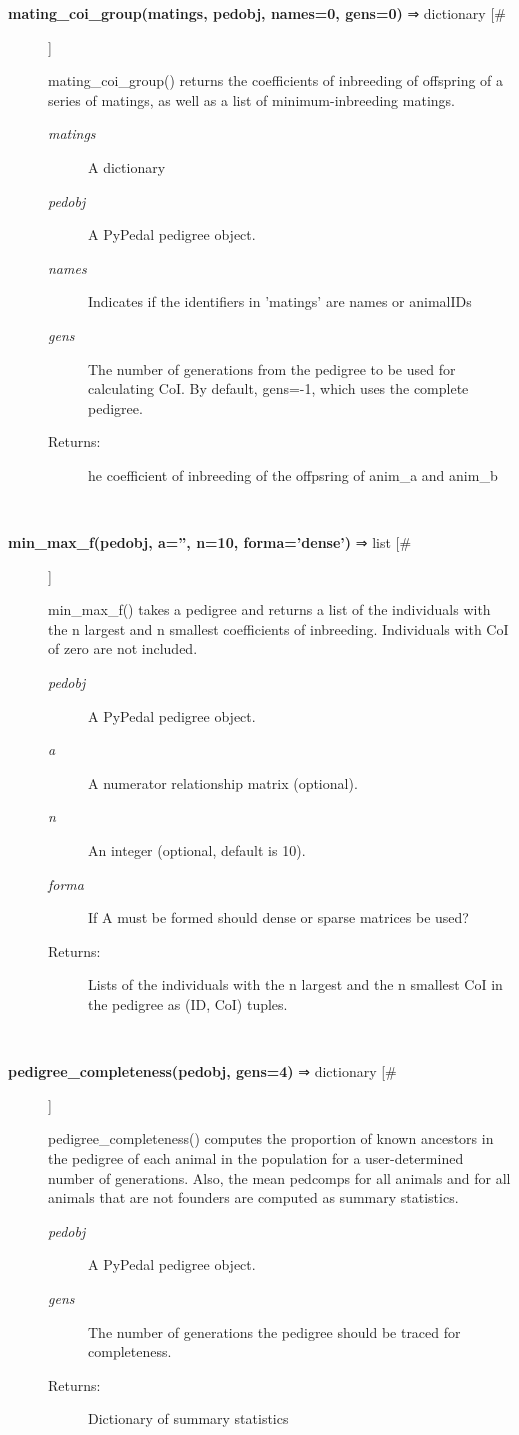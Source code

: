 \documentclass{article}
\begin{document}
\begin{description}
\item[\textbf{mating\_coi\_group(matings, pedobj, names=0, gens=0)} ⇒ dictionary [\#]
]
\par mating\_coi\_group() returns the coefficients of inbreeding of offspring
of a series of matings, as well as a list of minimum-inbreeding matings.
\begin{description}
\item[\textit{matings}
]
A dictionary
\item[\textit{pedobj}
]
A PyPedal pedigree object.
\item[\textit{names}
]
Indicates if the identifiers in 'matings' are names or animalIDs
\item[\textit{gens}
]
The number of generations from the pedigree to be used for calculating CoI.  By default, gens=-1, which uses the complete pedigree.
\item[Returns:
]
he coefficient of inbreeding of the offpsring of anim\_a and anim\_b
\end{description}\\

\item[\textbf{min\_max\_f(pedobj, a='', n=10, forma='dense')} ⇒ list [\#]
]
\par min\_max\_f() takes a pedigree and returns a list of the individuals with the n
largest and n smallest coefficients of inbreeding.  Individuals with CoI of
zero are not included.
\begin{description}
\item[\textit{pedobj}
]
A PyPedal pedigree object.
\item[\textit{a}
]
A numerator relationship matrix (optional).
\item[\textit{n}
]
An integer (optional, default is 10).
\item[\textit{forma}
]
If A must be formed should dense or sparse matrices be used?
\item[Returns:
]
Lists of the individuals with the n largest and the  n smallest CoI in the pedigree as (ID, CoI) tuples.
\end{description}\\

\item[\textbf{pedigree\_completeness(pedobj, gens=4)} ⇒ dictionary [\#]
]
\par pedigree\_completeness() computes the proportion of known ancestors in the pedigree of
each animal in the population for a user-determined number of generations.    Also,
the mean pedcomps for all animals and for all animals that are not founders are
computed as summary statistics.
\begin{description}
\item[\textit{pedobj}
]
A PyPedal pedigree object.
\item[\textit{gens}
]
The number of generations the pedigree should be traced for completeness.
\item[Returns:
]
Dictionary of summary statistics
\end{description}\\


\end{description}
\end{document}
